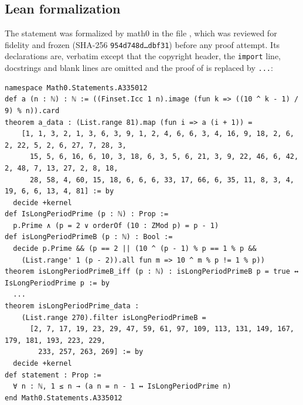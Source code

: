 \documentclass[11pt]{amsart}
\theoremstyle{plain}
\theoremstyle{definition}
\begin{document}
\subsection*{Lean formalization}
The statement was formalized by math0 in the file
, which was reviewed for fidelity and frozen (SHA-256 \texttt{954d748d\ldots dbf31}) before any proof attempt.
Its declarations are, verbatim except that the copyright header, the \texttt{import} line, docstrings and blank lines are omitted and the proof of  is replaced by \texttt{...}:
\begin{lstlisting}[basicstyle=\ttfamily\scriptsize]
namespace Math0.Statements.A335012
def a (n : ℕ) : ℕ := ((Finset.Icc 1 n).image (fun k => ((10 ^ k - 1) / 9) % n)).card
theorem a_data : (List.range 81).map (fun i => a (i + 1)) =
    [1, 1, 3, 2, 1, 3, 6, 3, 9, 1, 2, 4, 6, 6, 3, 4, 16, 9, 18, 2, 6, 2, 22, 5, 2, 6, 27, 7, 28, 3,
      15, 5, 6, 16, 6, 10, 3, 18, 6, 3, 5, 6, 21, 3, 9, 22, 46, 6, 42, 2, 48, 7, 13, 27, 2, 8, 18,
      28, 58, 4, 60, 15, 18, 6, 6, 6, 33, 17, 66, 6, 35, 11, 8, 3, 4, 19, 6, 6, 13, 4, 81] := by
  decide +kernel
def IsLongPeriodPrime (p : ℕ) : Prop :=
  p.Prime ∧ (p = 2 ∨ orderOf (10 : ZMod p) = p - 1)
def isLongPeriodPrimeB (p : ℕ) : Bool :=
  decide p.Prime && (p == 2 || (10 ^ (p - 1) % p == 1 % p &&
    (List.range' 1 (p - 2)).all fun m => 10 ^ m % p != 1 % p))
theorem isLongPeriodPrimeB_iff (p : ℕ) : isLongPeriodPrimeB p = true ↔ IsLongPeriodPrime p := by
  ...
theorem isLongPeriodPrime_data :
    (List.range 270).filter isLongPeriodPrimeB =
      [2, 7, 17, 19, 23, 29, 47, 59, 61, 97, 109, 113, 131, 149, 167, 179, 181, 193, 223, 229,
        233, 257, 263, 269] := by
  decide +kernel
def statement : Prop :=
  ∀ n : ℕ, 1 ≤ n → (a n = n - 1 ↔ IsLongPeriodPrime n)
end Math0.Statements.A335012
\end{lstlisting}
\end{document}
